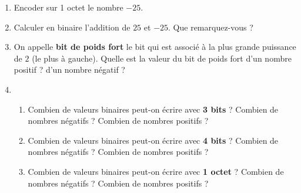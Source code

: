 \documentclass[11pt,a4paper]{article}
\newcounter{num}
\newcounter{rem}
\begin{document}
\begin{enumerate}
\item Encoder sur 1 octet le nombre $-25$.

\item Calculer en binaire l'addition de $25$ et $-25$. Que remarquez-vous ?

\item On appelle \textbf{bit de poids fort} le bit qui est associé à la plus grande puissance de $2$ (le plus à gauche). Quelle est la valeur du bit de poids fort d'un nombre positif ? d'un nombre négatif ?

\item \begin{enumerate}

\item Combien de valeurs binaires peut-on écrire avec \textbf{3 bits} ? Combien de nombres négatifs ? Combien de nombres positifs ?

\item Combien de valeurs binaires peut-on écrire avec \textbf{4 bits} ? Combien de nombres négatifs ? Combien de nombres positifs ?

\item Combien de valeurs binaires peut-on écrire avec \textbf{1 octet} ? Combien de nombres négatifs ? Combien de nombres positifs ?

\end{enumerate}


\end{enumerate}
\end{document}
